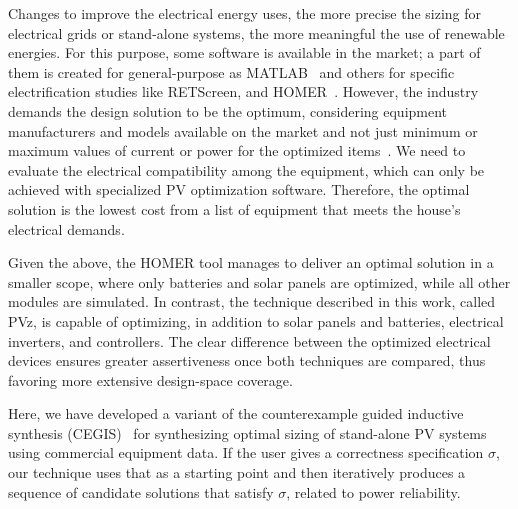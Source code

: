 \documentclass[10pt,journal,compsoc]{IEEEtran}
\begin{document}
Changes to improve the electrical energy uses, the more precise the sizing for electrical grids or stand-alone systems, the more meaningful the use of renewable energies. For this purpose, some software is available in the market; a part of them is created for general-purpose as MATLAB~\cite{Benatiallah2017} and others for specific electrification studies like RETScreen, and HOMER~\cite{Pradhan,Swarnkar}. However, the industry demands the design solution to be the optimum, considering equipment manufacturers and models available on the market and not just minimum or maximum values of current or power for the optimized items~\cite{DBLP:journals/corr/abs-1909-13139, Applasamy2011}. We need to evaluate the electrical compatibility among the equipment, which can only be achieved with specialized PV optimization software. Therefore, the optimal solution is the lowest cost from a list of equipment that meets the house's electrical demands.

Given the above, the HOMER tool manages to deliver an optimal solution in a smaller scope, where only batteries and solar panels are optimized, while all other modules are simulated. In contrast, the technique described in this work, called PVz, is capable of optimizing, in addition to solar panels and batteries, electrical inverters, and controllers. The clear difference between the optimized electrical devices ensures greater assertiveness once both techniques are compared, thus favoring more extensive design-space coverage.

Here, we have developed a variant of the counterexample guided inductive synthesis (CEGIS)~\cite{AbateCAV2018} for synthesizing optimal sizing of stand-alone PV systems using commercial equipment data. If the user gives a correctness specification $\sigma$, our technique uses that as a starting point and then iteratively produces a sequence of candidate solutions that satisfy $\sigma$, related to power reliability.
 
\end{document}
